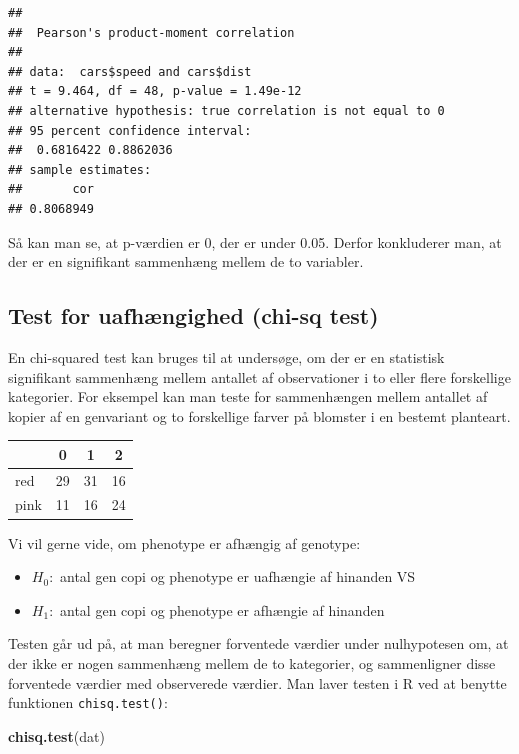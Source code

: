 \documentclass[
]{book}
\newenvironment{Shaded}{\begin{snugshade}}{\end{snugshade}}
\newcommand{\FunctionTok}[1]{\textcolor[rgb]{0.13,0.29,0.53}{\textbf{#1}}}
\newcommand{\NormalTok}[1]{#1}
\providecommand{\tightlist}{%
  \setlength{\itemsep}{0pt}\setlength{\parskip}{0pt}}
\begin{document}
\begin{verbatim}
## 
##  Pearson's product-moment correlation
## 
## data:  cars$speed and cars$dist
## t = 9.464, df = 48, p-value = 1.49e-12
## alternative hypothesis: true correlation is not equal to 0
## 95 percent confidence interval:
##  0.6816422 0.8862036
## sample estimates:
##       cor 
## 0.8068949
\end{verbatim}

Så kan man se, at p-værdien er 0, der er under 0.05. Derfor konkluderer man, at der er en signifikant sammenhæng mellem de to variabler.

\subsection{Test for uafhængighed (chi-sq test)}\label{test-for-uafhuxe6ngighed-chi-sq-test}

En chi-squared test kan bruges til at undersøge, om der er en statistisk signifikant sammenhæng mellem antallet af observationer i to eller flere forskellige kategorier. For eksempel kan man teste for sammenhængen mellem antallet af kopier af en genvariant og to forskellige farver på blomster i en bestemt planteart.

\begin{longtable}[]{@{}lccc@{}}
\toprule\noalign{}
& 0 & 1 & 2 \\
\midrule\noalign{}
\endhead
\bottomrule\noalign{}
\endlastfoot
red & 29 & 31 & 16 \\
pink & 11 & 16 & 24 \\
\end{longtable}

Vi vil gerne vide, om phenotype er afhængig af genotype:

\begin{itemize}
\tightlist
\item
  \(H_{0}:\) antal gen copi og phenotype er uafhængie af hinanden VS
\item
  \(H_{1}:\) antal gen copi og phenotype er afhængie af hinanden
\end{itemize}

Testen går ud på, at man beregner forventede værdier under nulhypotesen om, at der ikke er nogen sammenhæng mellem de to kategorier, og sammenligner disse forventede værdier med observerede værdier. Man laver testen i R ved at benytte funktionen \texttt{chisq.test()}:

\begin{Shaded}
\begin{Highlighting}[]
\FunctionTok{chisq.test}\NormalTok{(dat)}
\end{Highlighting}
\end{Shaded}
\end{document}
